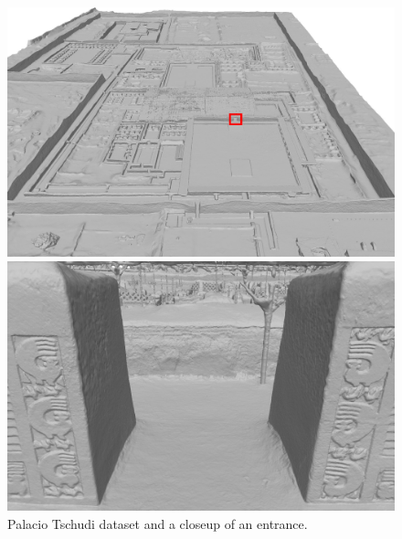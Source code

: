\documentclass[10pt,twocolumn,letterpaper]{article}
\begin{document}
\begin{figure}
    \centering
    \capstart
    \begin{minipage}[b]{0.49\linewidth}
        \includegraphics[width=\textwidth]{images/figures/results/palacio/whole2_selection_highlight.jpg}
    \end{minipage}
    \begin{minipage}[b]{0.49\linewidth}
        \includegraphics[width=\textwidth]{images/figures/results/palacio/entrance.jpg}
    \end{minipage}
    \caption{Palacio Tschudi dataset and a closeup of an entrance.}
    \label{fig:palacio}
\end{figure}
\end{document}
